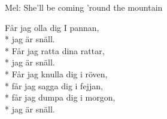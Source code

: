 \begin{SongText}
    \begin{SongInfo}
        Mel: She’ll be coming ’round the mountain
    \end{SongInfo}
    \begin{SongVerse}
        Får jag olla dig I pannan,\\*%
        jag är snäll.\\*%
        Får jag ratta dina rattar,\\*%
        jag är snäll.\\*%
        Får jag knulla dig i röven,\\*%
        får jag sagga dig i fejjan,\\*%
        får jag dumpa dig i morgon,\\*%
        jag är snäll.
    \end{SongVerse}
\end{SongText}
